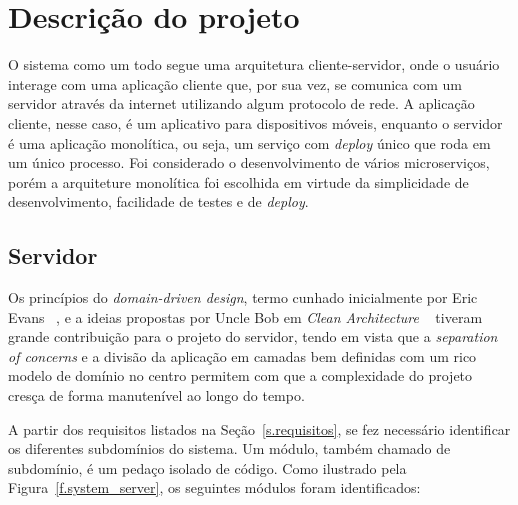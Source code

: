 \chapter{Descrição do projeto}
\label{c.descricao-do-projeto}


O sistema como um todo segue uma arquitetura cliente-servidor, onde o usuário interage com uma aplicação cliente que, por sua vez, se comunica com um servidor através da internet utilizando algum protocolo de rede. A aplicação cliente, nesse caso, é um aplicativo para dispositivos móveis, enquanto o servidor é uma aplicação monolítica, ou seja, um serviço com \emph{deploy} único que roda em um único processo. Foi considerado o desenvolvimento de vários microserviços, porém a arquiteture monolítica foi escolhida em virtude da simplicidade de desenvolvimento, facilidade de testes e de \emph{deploy}.

\section{Servidor}
\label{s.servidor}

Os princípios do \emph{domain-driven design}, termo cunhado inicialmente por Eric Evans ~\cite{domain-driven-design}, e a ideias propostas por Uncle Bob em \emph{Clean Architecture} ~\cite{clean-architecture} tiveram grande contribuição para o projeto do servidor, tendo em vista que a \emph{separation of concerns} e a divisão da aplicação em camadas bem definidas com um rico modelo de domínio no centro permitem com que a complexidade do projeto cresça de forma manutenível ao longo do tempo.

A partir dos requisitos listados na Seção~\ref{s.requisitos}, se fez necessário identificar os diferentes subdomínios do sistema. Um módulo, também chamado de subdomínio, é um pedaço isolado de código. Como ilustrado pela Figura~\ref{f.system_server}, os seguintes módulos foram identificados:

